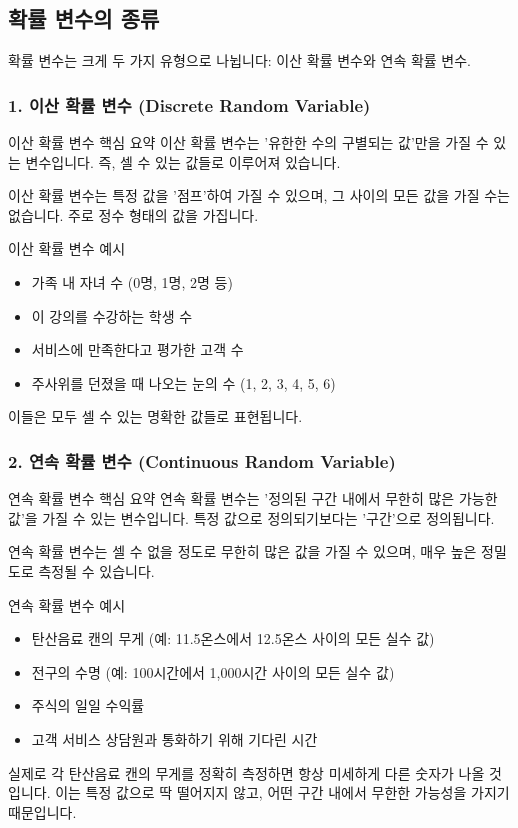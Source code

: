 \documentclass[11pt,a4paper]{article}
\theoremstyle{definition}
\begin{document}
\subsection{확률 변수의 종류}

확률 변수는 크게 두 가지 유형으로 나뉩니다: 이산 확률 변수와 연속 확률 변수.

\subsubsection*{1. 이산 확률 변수 (Discrete Random Variable)}

\begin{summarybox}{이산 확률 변수 핵심 요약}
이산 확률 변수는 '유한한 수의 구별되는 값'만을 가질 수 있는 변수입니다. 즉, 셀 수 있는 값들로 이루어져 있습니다.
\end{summarybox}

이산 확률 변수는 특정 값을 '점프'하여 가질 수 있으며, 그 사이의 모든 값을 가질 수는 없습니다. 주로 정수 형태의 값을 가집니다.

\begin{examplebox}{이산 확률 변수 예시}
\begin{itemize}
    \item 가족 내 자녀 수 (0명, 1명, 2명 등)
    \item 이 강의를 수강하는 학생 수
    \item 서비스에 만족한다고 평가한 고객 수
    \item 주사위를 던졌을 때 나오는 눈의 수 (1, 2, 3, 4, 5, 6)
\end{itemize}
이들은 모두 셀 수 있는 명확한 값들로 표현됩니다.
\end{examplebox}

\subsubsection*{2. 연속 확률 변수 (Continuous Random Variable)}

\begin{summarybox}{연속 확률 변수 핵심 요약}
연속 확률 변수는 '정의된 구간 내에서 무한히 많은 가능한 값'을 가질 수 있는 변수입니다. 특정 값으로 정의되기보다는 '구간'으로 정의됩니다.
\end{summarybox}

연속 확률 변수는 셀 수 없을 정도로 무한히 많은 값을 가질 수 있으며, 매우 높은 정밀도로 측정될 수 있습니다.

\begin{examplebox}{연속 확률 변수 예시}
\begin{itemize}
    \item 탄산음료 캔의 무게 (예: 11.5온스에서 12.5온스 사이의 모든 실수 값)
    \item 전구의 수명 (예: 100시간에서 1,000시간 사이의 모든 실수 값)
    \item 주식의 일일 수익률
    \item 고객 서비스 상담원과 통화하기 위해 기다린 시간
\end{itemize}
실제로 각 탄산음료 캔의 무게를 정확히 측정하면 항상 미세하게 다른 숫자가 나올 것입니다. 이는 특정 값으로 딱 떨어지지 않고, 어떤 구간 내에서 무한한 가능성을 가지기 때문입니다.
\end{examplebox}
\end{document}
